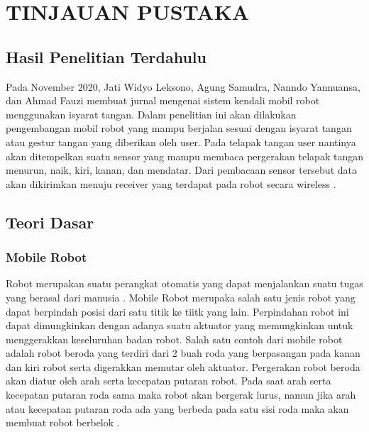 \section{TINJAUAN PUSTAKA}

\subsection{Hasil Penelitian Terdahulu}
Pada November 2020, Jati Widyo Leksono, Agung Samudra, Nanndo Yannuansa, dan Ahmad Fauzi membuat jurnal mengenai sistem kendali mobil robot menggunakan isyarat tangan. Dalam penelitian ini akan dilakukan pengembangan mobil robot yang mampu berjalan sesuai dengan isyarat tangan atau gestur tangan yang diberikan oleh user. Pada telapak tangan user nantinya akan ditempelkan suatu sensor yang mampu membaca pergerakan telapak tangan menurun, naik, kiri, kanan, dan mendatar. Dari pembacaan sensor tersebut data akan dikirimkan menuju receiver yang terdapat pada robot secara wireless \parencite{JurnalElectroLuecat}.

\subsection{Teori Dasar}

\subsubsection{Mobile Robot}
Robot merupakan suatu perangkat otomatis yang dapat menjalankan suatu tugas yang berasal dari manusia \parencite{Desainrobot}.
Mobile Robot merupaka salah satu jenis robot yang dapat berpindah posisi dari satu titik ke tiitk yang lain. Perpindahan robot ini dapat dimungkinkan dengan adanya suatu aktuator yang memungkinkan untuk menggerakkan keseluruhan badan robot. Salah satu contoh dari mobile robot adalah robot beroda yang terdiri dari 2 buah roda yang berpasangan pada kanan dan kiri robot serta digerakkan memutar oleh aktuator. Pergerakan robot beroda akan diatur oleh arah serta kecepatan putaran robot. Pada saat arah serta kecepatan putaran roda sama maka robot akan bergerak lurus, namun jika arah atau kecepatan putaran roda ada yang berbeda pada satu sisi roda maka akan membuat robot berbelok \parencite{mobilerobot}.

